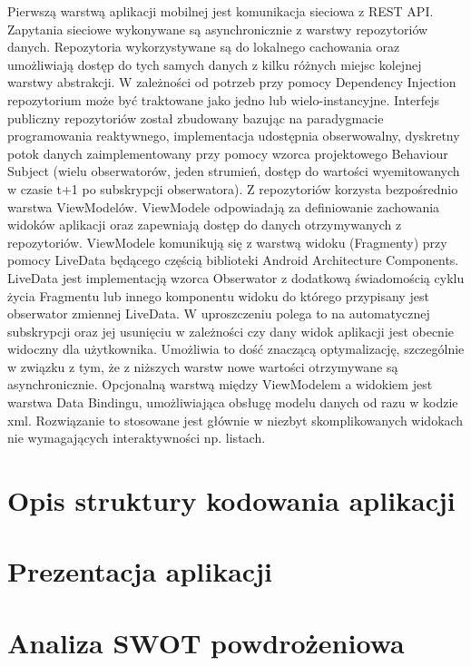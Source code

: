 \documentclass[polish, 11pt]{article}
\begin{document}
Pierwszą warstwą aplikacji mobilnej jest komunikacja sieciowa z REST API. Zapytania sieciowe wykonywane są asynchronicznie z warstwy repozytoriów danych. Repozytoria wykorzystywane są do lokalnego cachowania oraz umożliwiają dostęp do tych samych danych z kilku różnych miejsc kolejnej warstwy abstrakcji. W zależności od potrzeb przy pomocy Dependency Injection repozytorium może być traktowane jako jedno lub wielo-instancyjne. Interfejs publiczny repozytoriów został zbudowany bazując na paradygmacie programowania reaktywnego, implementacja udostępnia obserwowalny, dyskretny potok danych zaimplementowany przy pomocy wzorca projektowego Behaviour Subject (wielu obserwatorów, jeden strumień, dostęp do wartości wyemitowanych w czasie t+1 po subskrypcji obserwatora). Z repozytoriów korzysta bezpośrednio warstwa ViewModelów. ViewModele odpowiadają za definiowanie zachowania widoków aplikacji oraz zapewniają dostęp do danych otrzymywanych z repozytoriów.
ViewModele komunikują się z warstwą widoku (Fragmenty) przy pomocy LiveData będącego częścią biblioteki Android Architecture Components. LiveData jest implementacją wzorca Obserwator z dodatkową świadomością cyklu życia Fragmentu lub innego komponentu widoku do którego przypisany jest obserwator zmiennej LiveData. W uproszczeniu polega to na automatycznej subskrypcji oraz jej usunięciu w zależności czy dany widok aplikacji jest obecnie widoczny dla użytkownika. Umożliwia to dość znaczącą optymalizację, szczególnie w związku z tym, że z niższych warstw nowe wartości otrzymywane są asynchronicznie. Opcjonalną warstwą między ViewModelem a widokiem jest warstwa Data Bindingu, umożliwiająca obsługę modelu danych od razu w kodzie xml. Rozwiązanie to stosowane jest głównie w niezbyt skomplikowanych widokach nie wymagających interaktywności np. listach.     

\section{Opis struktury kodowania aplikacji}

\section{Prezentacja aplikacji}

\section{Analiza SWOT powdrożeniowa}
\end{document}
